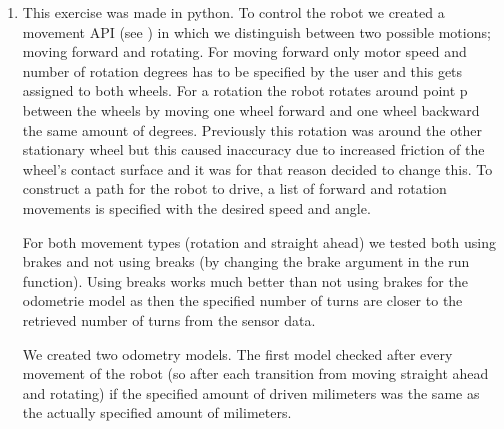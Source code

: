 \documentclass[a4paper, 20pt]{report}
\begin{document}
\begin{enumerate}
    \item{
            This exercise was made in python. To control the robot we created 
            a movement API (see )
            in which we distinguish between two possible motions; moving forward
            and rotating. For moving forward only motor speed and number of
            rotation degrees has to be specified by the user and this gets assigned to both
            wheels. For a rotation the robot rotates around point p between the
            wheels by moving
            one wheel forward and one wheel backward the same amount of degrees.
            Previously this rotation was around the other stationary wheel but
            this caused inaccuracy due to increased friction of the wheel's
            contact surface and it was for that reason decided to change this. 
            To construct a path for the robot to drive, a list of forward and rotation
            movements is specified with the desired speed and angle.

            For both movement types (rotation and straight ahead) we tested both using 
            brakes and not using breaks (by changing the brake argument in the run function). 
            Using breaks works much better than not using brakes for the
            odometrie model as then the specified number of turns are closer to
            the retrieved number of turns from the sensor data.

            We created two odometry models. The first model checked after every
            movement of the robot (so after each transition from moving straight
            ahead and rotating) if the specified amount of driven milimeters was the
            same as the actually specified amount of milimeters.  
        }
        

\end{enumerate}
\end{document}
